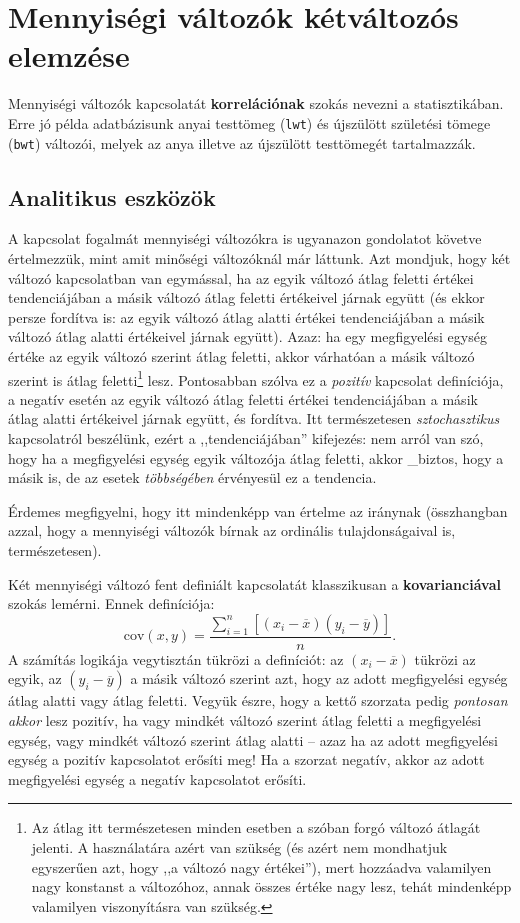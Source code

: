 \documentclass[]{book}
\let\rmarkdownfootnote\footnote%
\def\footnote{\protect\rmarkdownfootnote}
\begin{document}
\section{Mennyiségi változók kétváltozós
elemzése}\label{deskriptivmennyketvalt}

Mennyiségi változók kapcsolatát \textbf{korrelációnak} szokás nevezni a
statisztikában. Erre jó példa adatbázisunk anyai testtömeg
(\texttt{lwt}) és újszülött születési tömege (\texttt{bwt}) változói,
melyek az anya illetve az újszülött testtömegét tartalmazzák.

\subsection{Analitikus eszközök}\label{deskriptivmennyketvaltanalitikus}

A kapcsolat fogalmát mennyiségi változókra is ugyanazon gondolatot
követve értelmezzük, mint amit minőségi változóknál már láttunk. Azt
mondjuk, hogy két változó kapcsolatban van egymással, ha az egyik
változó átlag feletti értékei tendenciájában a másik változó átlag
feletti értékeivel járnak együtt (és ekkor persze fordítva is: az egyik
változó átlag alatti értékei tendenciájában a másik változó átlag alatti
értékeivel járnak együtt). Azaz: ha egy megfigyelési egység értéke az
egyik változó szerint átlag feletti, akkor várhatóan a másik változó
szerint is átlag
feletti\footnote{Az átlag itt természetesen minden esetben a szóban forgó változó átlagát jelenti. A használatára azért van szükség (és azért nem mondhatjuk egyszerűen azt, hogy ,,a változó nagy értékei''), mert hozzáadva valamilyen nagy konstanst a változóhoz, annak összes értéke nagy lesz, tehát mindenképp valamilyen viszonyításra van szükség.}
lesz. Pontosabban szólva ez a \emph{pozitív} kapcsolat definíciója, a
negatív esetén az egyik változó átlag feletti értékei tendenciájában a
másik átlag alatti értékeivel járnak együtt, és fordítva. Itt
természetesen \emph{sztochasztikus} kapcsolatról beszélünk, ezért a
,,tendenciájában'' kifejezés: nem arról van szó, hogy ha a megfigyelési
egység egyik változója átlag feletti, akkor \_biztos, hogy a másik is,
de az esetek \emph{többségében} érvényesül ez a tendencia.

Érdemes megfigyelni, hogy itt mindenképp van értelme az iránynak
(összhangban azzal, hogy a mennyiségi változók bírnak az ordinális
tulajdonságaival is, természetesen).

Két mennyiségi változó fent definiált kapcsolatát klasszikusan a
\textbf{kovarianciával} szokás lemérni. Ennek definíciója: \[
    \mathrm{cov}\left(x,y\right)=\frac{\sum_{i=1}^n \left[\left(x_i-\overline{x}\right)\left(y_i-\overline{y}\right)\right]}{n}.
\] A számítás logikája vegytisztán tükrözi a definíciót: az
\(\left(x_i-\overline{x}\right)\) tükrözi az egyik, az
\(\left(y_i-\overline{y}\right)\) a másik változó szerint azt, hogy az
adott megfigyelési egység átlag alatti vagy átlag feletti. Vegyük észre,
hogy a kettő szorzata pedig \emph{pontosan akkor} lesz pozitív, ha vagy
mindkét változó szerint átlag feletti a megfigyelési egység, vagy
mindkét változó szerint átlag alatti -- azaz ha az adott megfigyelési
egység a pozitív kapcsolatot erősíti meg! Ha a szorzat negatív, akkor az
adott megfigyelési egység a negatív kapcsolatot erősíti.
\end{document}

